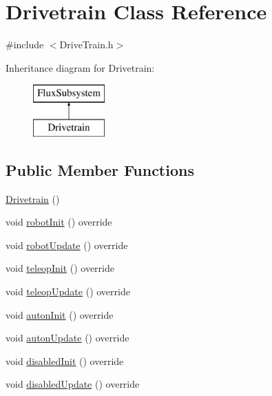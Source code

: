 \hypertarget{classDrivetrain}{}\section{Drivetrain Class Reference}
\label{classDrivetrain}


{\ttfamily \#include $<$Drive\+Train.\+h$>$}

Inheritance diagram for Drivetrain\+:\begin{figure}[H]
\begin{center}
\leavevmode
\includegraphics[height=2.000000cm]{classDrivetrain}
\end{center}
\end{figure}
\subsection*{Public Member Functions}
\begin{DoxyCompactItemize}
\item 
\hyperlink{classDrivetrain_abfcc3eea7516b5f76422d39676adbd27}{Drivetrain} ()
\item 
void \hyperlink{classDrivetrain_a7e9c10a27b3cc5ad89f2338de39b7c62}{robot\+Init} () override
\item 
void \hyperlink{classDrivetrain_a2a2b5976426dc0c1f45438fd7a5926e4}{robot\+Update} () override
\item 
void \hyperlink{classDrivetrain_a12d7edbb3a1b5d4ffa4ecb381c1ab115}{teleop\+Init} () override
\item 
void \hyperlink{classDrivetrain_a3b6bdf96a9388285c7560b2fedfc7ca1}{teleop\+Update} () override
\item 
void \hyperlink{classDrivetrain_a6aec7fa1a9daf1233a59fe0243d3bc8c}{auton\+Init} () override
\item 
void \hyperlink{classDrivetrain_ab451b48c598fa715ff1a8117ddc6f705}{auton\+Update} () override
\item 
void \hyperlink{classDrivetrain_ac6fe041de609bdb45eac65282fbdf507}{disabled\+Init} () override
\item 
void \hyperlink{classDrivetrain_a46aa479a25757868bfda71081ec7baa2}{disabled\+Update} () override
\end{DoxyCompactItemize}


